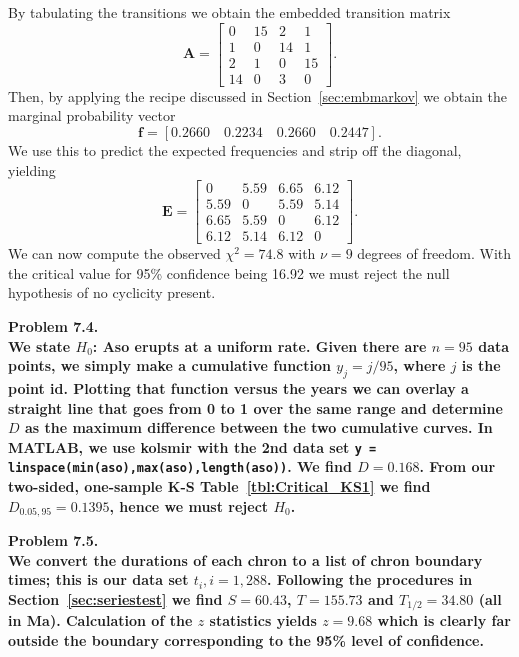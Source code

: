 By tabulating the transitions we obtain the embedded transition matrix
$$
\mathbf{A} = \left [ \begin{array}{cccc}
    0  & 15  &  2 &  1 \\
    1  &  0  & 14 &  1 \\
    2  &  1  &  0 & 15 \\
    14 &  0  &  3 &  0
\end{array} \right ].
$$
Then, by applying the recipe discussed in Section~\ref{sec:embmarkov} we obtain the marginal probability vector
$$
\mathbf{f} = \left [ 0.2660 \quad 0.2234 \quad 0.2660 \quad 0.2447 \right ].
$$
We use this to predict the expected frequencies and strip off the diagonal, yielding
$$
\mathbf{E} = \left [ \begin{array}{cccc}
    0     & 5.59  & 6.65 & 6.12 \\
    5.59  & 0     & 5.59 & 5.14 \\
    6.65  & 5.59  & 0    & 6.12 \\
    6.12  & 5.14  & 6.12 & 0
\end{array} \right ].
$$
We can now compute the observed $\chi^2 = 74.8$ with $\nu = 9$ degrees of freedom.  With the critical
value for 95\% confidence being 16.92 we must reject the null hypothesis of no cyclicity present.

\noindent
\bf{Problem 7.4.} \\

We state $H_0$: Aso erupts at a uniform rate. Given there are $n = 95$ data points, we simply make a cumulative function $y_j = j / 95$, where
$j$ is the point id.  Plotting that function versus the years we can overlay a straight line that goes from 0
to 1 over the same range and determine $D$ as the maximum difference between the two cumulative curves.  In MATLAB,
we use kolsmir with the 2nd data set \verb!y = linspace(min(aso),max(aso),length(aso))!.  We find
$D = 0.168$.  From our two-sided, one-sample K-S Table~\ref{tbl:Critical_KS1} we find $D_{0.05,95} = 0.1395$, hence we must reject $H_0$.

\noindent
\bf{Problem 7.5.} \\

We convert the durations of each chron to a list of chron boundary times; this is our data set $t_i, i = 1,288$.  Following the
procedures in Section~\ref{sec:seriestest} we find $S = 60.43$, $T = 155.73$ and $T_{1/2} = 34.80$ (all in Ma).
Calculation of the $z$ statistics yields $z = 9.68$ which is clearly far outside the boundary corresponding to
the 95\% level of confidence. \\


